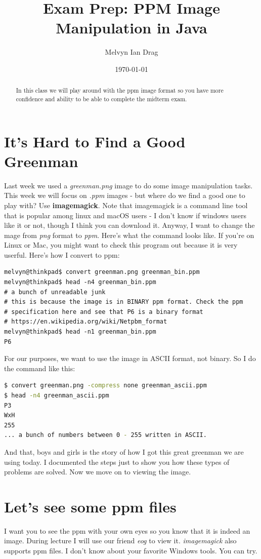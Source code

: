 \documentclass[12pt]{article}
\title{\textbf{Exam Prep:} PPM Image Manipulation in Java}
\author{
	Melvyn Ian Drag
}
\date{\today}
\begin{document}
\maketitle

\begin{abstract}
In this class we will play around with the ppm image format so you have more confidence and ability to be able to complete the midterm exam.
\end{abstract}


\section{It's Hard to Find a Good Greenman}
Last week we used a \textit{greenman.png} image to do some image manipulation tasks. This week we will focus on \textit{.ppm} images - but where do we find a good one to play with? Use \textbf{imagemagick}. Note that imagemagick is a command line tool that is popular among linux and macOS users - I don't know if windows users like it or not, though I think you can download it. Anyway, I want to change the 
mage from \textit{png} format to \textit{ppm}. Here's what the command looks like. If you're on Linux or Mac, you might want to check this program out because it is very userful. Here's how I convert to ppm:

\begin{lstlisting}
melvyn@thinkpad$ convert greenman.png greenman_bin.ppm
melvyn@thinkpad$ head -n4 greenman_bin.ppm
# a bunch of unreadable junk
# this is because the image is in BINARY ppm format. Check the ppm
# specification here and see that P6 is a binary format
# https://en.wikipedia.org/wiki/Netpbm_format
melvyn@thinkpad$ head -n1 greenman_bin.ppm
P6
\end{lstlisting}

For our purposes, we want to use the image in ASCII format, not binary. So I do the command like this:

\begin{lstlisting}[language=bash]
$ convert greenman.png -compress none greenman_ascii.ppm
$ head -n4 greenman_ascii.ppm
P3
WxH
255
... a bunch of numbers between 0 - 255 written in ASCII.
\end{lstlisting}

And that, boys and girls is the story of how I got this great greenman we are using today. I documented the steps just to show you how these types of problems are solved. Now we move on to viewing the image.

\section{Let's see some ppm files}
I want you to see the ppm with your own eyes so you know that it is indeed an image. During lecture I will use our friend \textit{eog} to view it. \textit{imagemagick} also supports ppm files. I don't know about your favorite Windows tools. You can try. 
\end{document}
